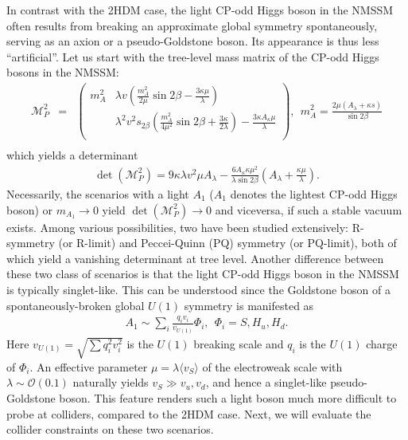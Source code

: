\documentclass[preprintnumbers,superscriptaddress,nofootinbib,aps,prd,floatfix]{revtex4}
\begin{document}
In contrast with the 2HDM case, the light CP-odd Higgs boson in the NMSSM often results from breaking an approximate global symmetry spontaneously, serving as an axion or a pseudo-Goldstone boson. Its appearance is thus less ``artificial''. Let us start with the tree-level mass matrix of the CP-odd Higgs bosons in the NMSSM: 
\begin{eqnarray}
\mathcal{M}^2_{P} & = & \left(
\begin{array}{cc}
m_A^2
&\lambda  v \left(\frac{m_A^2 }{2\mu }\sin 2 \beta -\frac{3 \kappa  \mu }{\lambda }\right)
\\
&
\lambda ^2 v^2 s_{2\beta}  \left(\frac{m_A^2}{4\mu ^2} \sin 2 \beta+\frac{3 \kappa }{2\lambda }\right)-\frac{3
   \kappa  A_{\kappa } \mu }{\lambda }\\
\end{array} 
\right), \ \  m_A^2 = \frac{2 \mu (A_\lambda + \kappa s) }{\sin 2 \beta} \nonumber\\
\end{eqnarray}
which yields a determinant
\begin{eqnarray}
\det(\mathcal{M}^2_{P}) = 9 \kappa \lambda v^2 \mu A_\lambda - \frac{6 A_\kappa \kappa \mu^2}{\lambda \sin2\beta} \left( A_\lambda + \frac{\kappa \mu }{\lambda} \right).
\end{eqnarray}
Necessarily, the scenarios with a light $A_1$ ($A_1$ denotes the lightest CP-odd Higgs boson) or $m_{A_1} \to 0$ yield $\det(\mathcal{M}^2_{P})  \to 0$
and viceversa, if such a stable vacuum exists. Among various possibilities, two have been studied extensively: 
R-symmetry (or R-limit) and Peccei-Quinn (PQ) symmetry (or PQ-limit), both of which yield a vanishing determinant at tree level. 
Another difference between these two class of scenarios is that the light CP-odd Higgs boson in the NMSSM is typically singlet-like. This can be understood since the Goldstone boson of a spontaneously-broken global $U(1)$ symmetry is manifested as  
\begin{eqnarray}
A_1 \sim \sum_i \frac{q_i v_i}{v_{U(1)}} \Phi_i, \ \ \Phi_i = S, H_u, H_d.
\end{eqnarray}
Here $v_{U(1)} = \sqrt{\sum q_i^2 v_i^2}$ is the $U(1)$ breaking scale and $q_i$ is the $U(1)$ charge of $\Phi_i$. An effective parameter $\mu = \lambda \langle v_S\rangle $ of the electroweak scale with  $\lambda \sim \mathcal O(0.1)$ naturally yields $v_S \gg v_u, v_d$, and hence a singlet-like pseudo-Goldstone boson. This feature renders such a light boson much more difficult to probe at colliders, compared to the 2HDM case. Next, we will evaluate the collider constraints on 
these two scenarios. 
\end{document}
